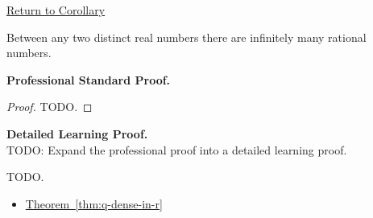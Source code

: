 \newpage
{}
\label{prf:infinitely-many-rationals-between}

\begin{remark*}[Return]
\hyperref[cor:infinitely-many-rationals-between]{Return to Corollary}
\end{remark*}

\begin{theorem*}
Between any two distinct real numbers there are infinitely many rational numbers.
\end{theorem*}

\textbf{Professional Standard Proof.}~\\
\begin{proof}
TODO.
\end{proof}

\textbf{Detailed Learning Proof.}~\\
TODO: Expand the professional proof into a detailed learning proof.


\begin{remark*}
TODO.
\end{remark*}

\begin{dependencies}
\begin{itemize}
  \item \hyperref[thm:q-dense-in-r]{Theorem~\ref*{thm:q-dense-in-r}}
\end{itemize}
\end{dependencies}

